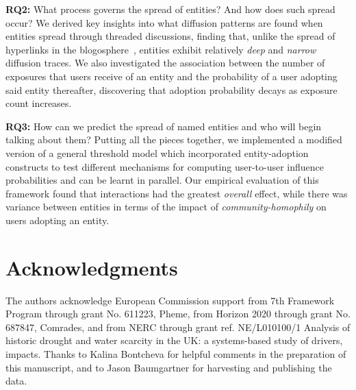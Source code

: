 \documentclass[acmsmall]{acmart}
\begin{document}
 \textbf{RQ2:} What process governs the spread of entities? And how does such spread occur?
We derived key insights into what diffusion patterns are found when entities spread through threaded discussions,  finding that, unlike the spread of hyperlinks in the blogosphere~\cite{leskovec2007patterns}, entities exhibit relatively \emph{deep} and \emph{narrow} diffusion traces.
We also investigated the association between the number of exposures that users receive of an entity and the probability of a user adopting said entity thereafter, discovering that adoption probability decays as exposure count increases.

 \textbf{RQ3:} How can we predict the spread of named entities and who will begin talking about them?	
Putting all the pieces together, we implemented a modified version of a general threshold model which incorporated entity-adoption constructs to test different mechanisms for computing user-to-user influence probabilities and can be learnt in parallel.
Our empirical evaluation of this framework found that interactions had the greatest \emph{overall} effect, while there was variance between entities in terms of the impact of \emph{community-homophily} on users adopting an entity.

\section*{Acknowledgments}
The authors acknowledge European Commission support from 7th Framework Program through grant No. 611223, {\sc Pheme}, from Horizon 2020 through grant No. 687847, Comrades, and from NERC through grant ref. NE/L010100/1 Analysis of historic drought and water scarcity in the UK: a systems-based study of drivers, impacts. Thanks to Kalina Bontcheva for helpful comments in the preparation of this manuscript, and to Jason Baumgartner for harvesting and publishing the data.

\nocite{*} 


\end{document}
